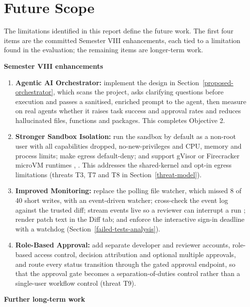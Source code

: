 \documentclass[12pt,a4paper,oneside]{report}
\providecommand{\tightlist}{\setlength{\itemsep}{0pt}\setlength{\parskip}{0pt}}
\begin{document}
\clearpage

\chapter{Future Scope}\label{future-scope}

The limitations identified in this report define the future work. The first four items are the committed Semester VIII enhancements, each tied to a limitation found in the evaluation; the remaining items are longer-term work.

\medskip\noindent\textbf{Semester VIII enhancements}\label{sem8-enhancements}

\begin{enumerate}
\def\labelenumi{\arabic{enumi}.}
\tightlist
\item
  \textbf{Agentic AI Orchestrator:} implement the design in Section~\ref{proposed-orchestrator}, which scans the project, asks clarifying questions before execution and passes a sanitised, enriched prompt to the agent, then measure on real agents whether it raises task success and approval rates and reduces hallucinated files, functions and packages. This completes Objective 2.
\item
  \textbf{Stronger Sandbox Isolation:} run the sandbox by default as a non-root user with all capabilities dropped, no-new-privileges and CPU, memory and process limits; make egress default-deny; and support gVisor or Firecracker microVM runtimes \cite{ref12}, \cite{ref13}. This addresses the shared-kernel and opt-in egress limitations (threats T3, T7 and T8 in Section~\ref{threat-model}).
\item
  \textbf{Improved Monitoring:} replace the polling file watcher, which missed 8 of 40 short writes, with an event-driven watcher; cross-check the event log against the trusted diff; stream events live so a reviewer can interrupt a run \cite{ref9}; render patch text in the Diff tab; and enforce the interactive sign-in deadline with a watchdog (Section~\ref{failed-tests-analysis}).
\item
  \textbf{Role-Based Approval:} add separate developer and reviewer accounts, role-based access control, decision attribution and optional multiple approvals, and route every status transition through the gated approval endpoint, so that the approval gate becomes a separation-of-duties control rather than a single-user workflow control (threat T9).
\end{enumerate}

\noindent\textbf{Further long-term work}
\end{document}
